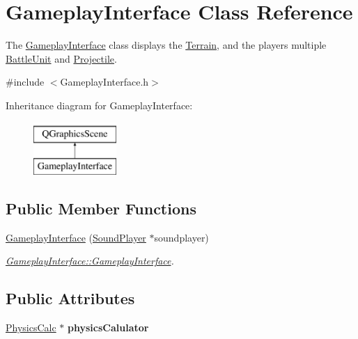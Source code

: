 \hypertarget{class_gameplay_interface}{}\section{Gameplay\+Interface Class Reference}
\label{class_gameplay_interface}


The \hyperlink{class_gameplay_interface}{Gameplay\+Interface} class displays the \hyperlink{class_terrain}{Terrain}, and the players\textquotesingle{} multiple \hyperlink{class_battle_unit}{Battle\+Unit} and \hyperlink{class_projectile}{Projectile}.  




{\ttfamily \#include $<$Gameplay\+Interface.\+h$>$}

Inheritance diagram for Gameplay\+Interface\+:\begin{figure}[H]
\begin{center}
\leavevmode
\includegraphics[height=2.000000cm]{class_gameplay_interface}
\end{center}
\end{figure}
\subsection*{Public Member Functions}
\begin{DoxyCompactItemize}
\item 
\hyperlink{class_gameplay_interface_ab75b8894a36f5697edc87e0acc2d31ce}{Gameplay\+Interface} (\hyperlink{class_sound_player}{Sound\+Player} $\ast$soundplayer)
\begin{DoxyCompactList}\small\item\em \hyperlink{class_gameplay_interface_ab75b8894a36f5697edc87e0acc2d31ce}{Gameplay\+Interface\+::\+Gameplay\+Interface}. \end{DoxyCompactList}\end{DoxyCompactItemize}
\subsection*{Public Attributes}
\begin{DoxyCompactItemize}
\item 
\hyperlink{class_physics_calc}{Physics\+Calc} $\ast$ {\bfseries physics\+Calulator}\hypertarget{class_gameplay_interface_adf09add3928dd254e051c3ecc070bee6}{}\label{class_gameplay_interface_adf09add3928dd254e051c3ecc070bee6}

\end{DoxyCompactItemize}


